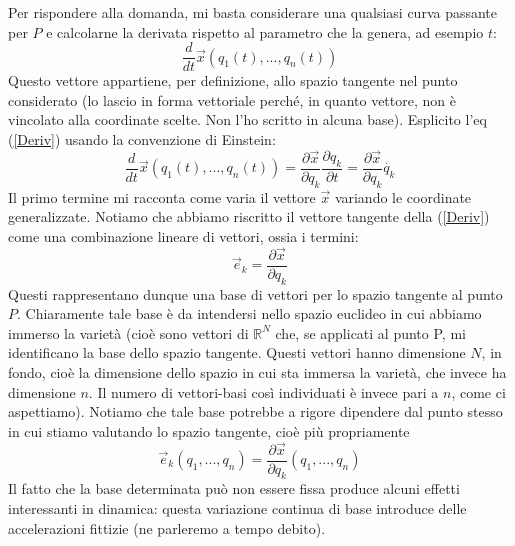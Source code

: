 \documentclass[a4paper,openany]{article}
\begin{document}
	Per rispondere alla domanda, mi basta considerare una qualsiasi curva passante per $P$ e calcolarne la derivata rispetto al parametro che la genera, ad esempio $t$:
	\begin{equation}
		\dfrac{d}{dt}\vec{x}(q_{1}(t), ..., q_{n}(t))
		\label{Deriv}
	\end{equation}
	Questo vettore appartiene, per definizione, allo spazio tangente nel punto considerato (lo lascio in forma vettoriale perché, in quanto vettore, non è vincolato alla coordinate scelte. Non l'ho scritto in alcuna base). Esplicito l'eq (\ref{Deriv}) usando la convenzione di Einstein:
	\begin{equation}
		\dfrac{d}{dt}\vec{x}(q_{1}(t), ..., q_{n}(t)) = \dfrac{\partial \vec{x}}{\partial q_{k}}\dfrac{\partial q_{k}}{\partial t} = \dfrac{\partial \vec{x}}{\partial q_{k}}\dot{q_{k}}
	\end{equation}
	Il primo termine mi racconta come varia il vettore $\vec{x}$ variando le coordinate generalizzate. Notiamo che abbiamo riscritto il vettore tangente della (\ref{Deriv}) come una combinazione lineare di vettori, ossia i termini:
	$$
	\vec{e}_{k} = \dfrac{\partial \vec{x}}{\partial q_{k}}
	$$
	Questi rappresentano dunque una base di vettori per lo spazio tangente al punto $P$. Chiaramente tale base è da intendersi nello spazio euclideo in cui abbiamo immerso la varietà (cioè sono vettori di $\mathbb{R}^{N}$ che, se applicati al punto P, mi identificano la base dello spazio tangente. Questi vettori hanno dimensione $N$, in fondo, cioè la dimensione dello spazio in cui sta immersa la varietà, che invece ha dimensione $n$. Il numero di vettori-basi così individuati è invece pari a $n$, come ci aspettiamo). Notiamo che tale base potrebbe a rigore dipendere dal punto stesso in cui stiamo valutando lo spazio tangente, cioè più propriamente
	\begin{equation}
		\vec{e}_{k}(q_{1}, ..., q_{n}) = \dfrac{\partial \vec{x}}{\partial q_{k}}(q_{1}, ..., q_{n})
	\end{equation}
	Il fatto che la base determinata può non essere fissa produce alcuni effetti interessanti in dinamica: questa variazione continua di base introduce delle accelerazioni fittizie (ne parleremo a tempo debito). 
	
\end{document}
